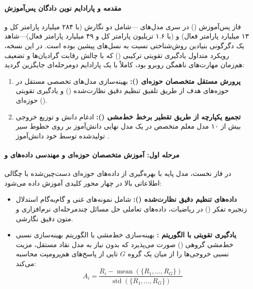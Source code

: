 \item {}

\paragraph*{مقدمه و پارادایم نوین دادگان پس‌آموزش}
فاز پس‌آموزش () در سری مدل‌های —شامل دو نگارش  (با ۲۸۴ میلیارد پارامتر کل و ۱۳ میلیارد پارامتر فعال) و  (با ۱.۶ تریلیون پارامتر کل و ۴۹ میلیارد پارامتر فعال)—شاهد یک دگرگونی بنیادین روش‌شناختی نسبت به نسل‌های پیشین بوده است. در این نسخه، رویکرد متداول یادگیری تقویتی ترکیبی () که با چالش رقابت گرادیان‌ها و تضعیف هم‌زمان مهارت‌های ناهمگن روبرو بود، کاملاً با یک پارادایم دومرحله‌ای جایگزین گردید:
\begin{enumerate}
    \item \textbf{پرورش مستقل متخصصان حوزه‌ای ():} بهینه‌سازی مدل‌های تخصصی مستقل در حوزه‌های هدف از طریق تلفیق تنظیم دقیق نظارت‌شده () و یادگیری تقویتی حوزه‌ای ().
    \item \textbf{تجمیع یکپارچه از طریق تقطیر برخط خط‌مشی ():} ادغام دانش و توزیع خروجی بیش از ۱۰ مدل معلم متخصص در یک مدل نهایی دانش‌آموز بر روی خطوط سیر تولیدشده توسط خود دانش‌آموز \cite{lu2025opd}.
\end{enumerate}

\paragraph*{مرحله اول: آموزش متخصصان حوزه‌ای و مهندسی داده‌های  و }
در فاز نخست، مدل پایه با بهره‌گیری از داده‌های حوزه‌ای دست‌چین‌شده با چگالی اطلاعاتی بالا در چهار محور کلیدی آموزش داده می‌شود:
\begin{itemize}
    \item \textbf{داده‌های تنظیم دقیق نظارت‌شده ():} شامل نمونه‌های غنی و گام‌به‌گام استدلال زنجیره تفکر () در ریاضیات، داده‌های تعاملی حل مسائل چندمرحله‌ای نرم‌افزاری و متون دقیق نگارشی.
    \item \textbf{یادگیری تقویتی با الگوریتم :} بهینه‌سازی خط‌مشی با الگوریتم بهینه‌سازی نسبی خط‌مشی گروهی () \cite{deepseek2025r1} صورت می‌پذیرد که بدون نیاز به مدل نقاد مستقل، مزیت نسبی خروجی‌ها را از میان یک گروه $G$ تایی از پاسخ‌های هم‌پرومپت محاسبه می‌کند:
    \begin{equation}
        A_i = \frac{R_i - \operatorname{mean}(\{R_1, \dots, R_G\})}{\operatorname{std}(\{R_1, \dots, R_G\})}
    \end{equation}
\end{itemize}


